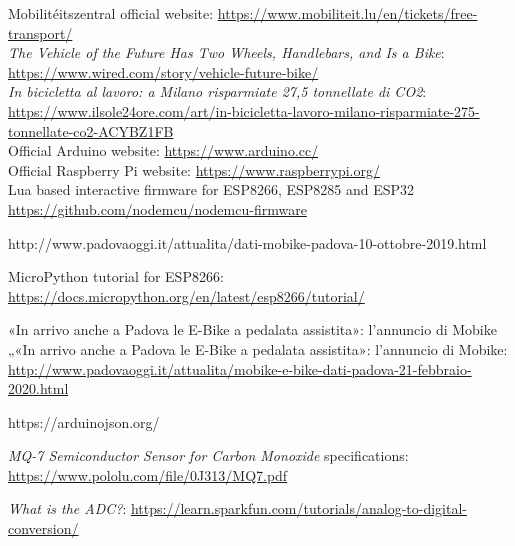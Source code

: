 \begin{thebibliography}{00}
	
 Mobilitéitszentral official website:  \url{https://www.mobiliteit.lu/en/tickets/free-transport/}\\

 \textit{The Vehicle of the Future Has Two Wheels, Handlebars, and Is a Bike}:  \url{https://www.wired.com/story/vehicle-future-bike/}\\

 \textit{In bicicletta al lavoro: a Milano risparmiate 27,5 tonnellate di CO2}:  \url{https://www.ilsole24ore.com/art/in-bicicletta-lavoro-milano-risparmiate-275-tonnellate-co2-ACYBZ1FB}\\

 Official Arduino website: \url{https://www.arduino.cc/}\\

 Official Raspberry Pi website: \url{https://www.raspberrypi.org/}\\
	
 Lua based interactive firmware for ESP8266, ESP8285 and ESP32 \url{https://github.com/nodemcu/nodemcu-firmware}

http://www.padovaoggi.it/attualita/dati-mobike-padova-10-ottobre-2019.html

 MicroPython tutorial for ESP8266: \url{https://docs.micropython.org/en/latest/esp8266/tutorial/}

 «In arrivo anche a Padova le E-Bike a pedalata assistita»: l'annuncio di Mobike
„«In arrivo anche a Padova le E-Bike a pedalata assistita»: l'annuncio di Mobike:  \href{http://www.padovaoggi.it/attualita/mobike-e-bike-dati-padova-21-febbraio-2020.html}{http://www.padovaoggi.it/attualita/mobike-e-bike-dati-padova-21-febbraio-2020.html}

https://arduinojson.org/

 \textit{MQ-7 Semiconductor Sensor for Carbon Monoxide} specifications:  \url{https://www.pololu.com/file/0J313/MQ7.pdf}

 \textit{What is the ADC?}:  \url{https://learn.sparkfun.com/tutorials/analog-to-digital-conversion/}
	
\end{thebibliography}
